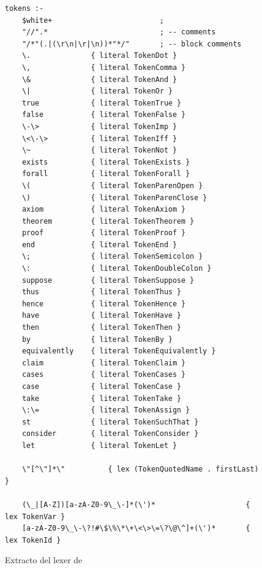 \begin{figure}[p]
    \begin{verbatim}
tokens :-
    $white+                         ;
    "//".*                          ; -- comments
    "/*"(.|(\r\n|\r|\n))*"*/"       ; -- block comments
    \.              { literal TokenDot }
    \,              { literal TokenComma }
    \&              { literal TokenAnd }
    \|              { literal TokenOr }
    true            { literal TokenTrue }
    false           { literal TokenFalse }
    \-\>            { literal TokenImp }
    \<\-\>          { literal TokenIff }
    \~              { literal TokenNot }
    exists          { literal TokenExists }
    forall          { literal TokenForall }
    \(              { literal TokenParenOpen }
    \)              { literal TokenParenClose }
    axiom           { literal TokenAxiom }
    theorem         { literal TokenTheorem }
    proof           { literal TokenProof }
    end             { literal TokenEnd }
    \;              { literal TokenSemicolon }
    \:              { literal TokenDoubleColon }
    suppose         { literal TokenSuppose }
    thus            { literal TokenThus }
    hence           { literal TokenHence }
    have            { literal TokenHave }
    then            { literal TokenThen }
    by              { literal TokenBy }
    equivalently    { literal TokenEquivalently }
    claim           { literal TokenClaim }
    cases           { literal TokenCases }
    case            { literal TokenCase }
    take            { literal TokenTake }
    \:\=            { literal TokenAssign }
    st              { literal TokenSuchThat }
    consider        { literal TokenConsider }
    let             { literal TokenLet }

    \"[^\"]*\"          { lex (TokenQuotedName . firstLast) }

    (\_|[A-Z])[a-zA-Z0-9\_\-]*(\')*                     { lex TokenVar }
    [a-zA-Z0-9\_\-\?!#\$\%\*\+\<\>\=\?\@\^]+(\')*       { lex TokenId }
    \end{verbatim}
    \caption{Extracto del lexer de \ppaTool{}}
    \label{ppa-tool:fig:lexer}
\end{figure}

